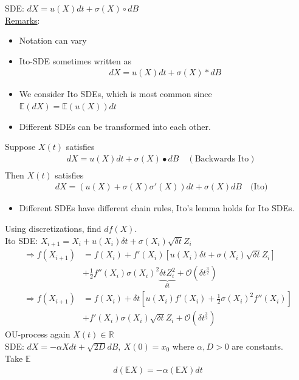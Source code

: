 \documentclass[12pt, letterpaper]{article}
\begin{document}
SDE: $dX = u(X)dt + \sigma(X)\circ dB$ \\
\underline{Remarks}:
\begin{itemize}
    \item Notation can vary
    \item Ito-SDE sometimes written as \begin{align*}
        dX = u(X)dt + \sigma(X)*dB
    \end{align*}
    \item We consider Ito SDEs, which is most common since $\mathbb{E}(dX) = \mathbb{E}(u(X))dt$
    \item Different SDEs can be transformed into each other.
\end{itemize}
 Suppose $X(t)$ satisfies 
\begin{align*}
    &dX = u(X)dt + \sigma(X)\bullet dB\quad (\text{Backwards Ito}) \\
\end{align*}
Then $X(t)$ satisfies 
\begin{align*}
    &dX = (u(X)+\sigma(X)\sigma'(X))dt + \sigma(X)dB\quad \text{(Ito)}
\end{align*}
\begin{itemize}
    \item Different SDEs have different chain rules, Ito's lemma holds for Ito SDEs.
\end{itemize}
 Using discretizations, find $df(X)$. \\
Ito SDE: $X_{i+1} = X_i + u(X_i)\delta t + \sigma(X_i)\sqrt{\delta t}Z_i$
\begin{align*}
    \Rightarrow f(X_{i+1}) &= f(X_i) + f'(X_i)[u(X_i)\delta t + \sigma(X_i)\sqrt{\delta t}Z_i] \\
    &+ \frac 12 f''(X_i) \sigma(X_i)^2 \underbrace{\delta t Z_i^2}_{\delta t} + \mathcal{O}(\delta t^\frac 32) \\
    \Rightarrow f(X_{i+1}) &= f(X_i) + \delta t [u(X_i)f'(X_i) + \frac 12 \sigma(X_i)^2f''(X_i)] \\
    &+ f'(X_i) \sigma(X_i)\sqrt{\delta t} Z_i + \mathcal{O}(\delta t^\frac 32)
\end{align*}
 OU-process again $X(t) \in \mathbb{R}$ \\
SDE: $dX = -\alpha Xdt + \sqrt{2D}dB,\ X(0) = x_0$ where $\alpha, D > 0 $ are constants. \\
Take $\mathbb{E}$
\begin{align*}
    d(\mathbb{E}X) = -\alpha(\mathbb{E}X)dt
\end{align*}
\end{document}
